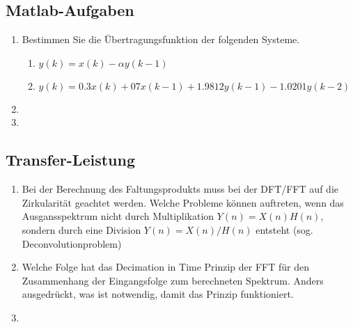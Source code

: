 {
\subsection{Matlab-Aufgaben}
\begin{enumerate}
    \item Bestimmen Sie die Übertragungsfunktion der folgenden Systeme.
    \begin{enumerate}
        \item $y(k) = x(k) - \alpha y(k-1)$
        \item $y(k) =  0.3 x(k) + 07 x(k-1) + 1.9812 y(k-1)   - 1.0201 y(k-2)$
    \end{enumerate}
    \item
    \item
\end{enumerate}
}
\subsection{Transfer-Leistung}
\begin{enumerate}
    \item Bei der Berechnung des Faltungsprodukts muss bei der DFT/FFT auf
die Zirkularität geachtet werden. Welche Probleme können
auftreten, wenn das Ausgansspektrum nicht durch Multiplikation
$Y(n) = X(n)H(n)$, sondern durch eine Division $Y(n) = X(n)/H(n)$
entsteht (sog. Deconvolutionproblem)
    \item Welche Folge hat das Decimation in Time Prinzip der FFT für den Zusammenhang der
    Eingangsfolge zum berechneten Spektrum. Anders ausgedrückt, was ist notwendig, damit das Prinzip
    funktioniert.
    \item
\end{enumerate}
%
